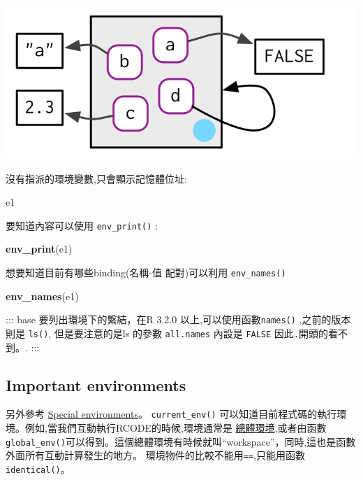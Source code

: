 \documentclass[]{book}
\newenvironment{Shaded}{\begin{snugshade}}{\end{snugshade}}
\newcommand{\KeywordTok}[1]{\textcolor[rgb]{0.13,0.29,0.53}{\textbf{#1}}}
\newcommand{\NormalTok}[1]{#1}
\theoremstyle{definition}
\theoremstyle{definition}
\theoremstyle{definition}
\theoremstyle{remark}
\begin{document}
\begin{center}\includegraphics{diagrams/environments/loop} \end{center}

沒有指派的環境變數,只會顯示記憶體位址:

\begin{Shaded}
\begin{Highlighting}[]
\NormalTok{e1}
\end{Highlighting}
\end{Shaded}

要知道內容可以使用 \texttt{env\_print()} :

\begin{Shaded}
\begin{Highlighting}[]
\KeywordTok{env_print}\NormalTok{(e1)}
\end{Highlighting}
\end{Shaded}

想要知道目前有哪些binding(名稱-值 配對)可以利用 \texttt{env\_names()}

\begin{Shaded}
\begin{Highlighting}[]
\KeywordTok{env_names}\NormalTok{(e1)}
\end{Highlighting}
\end{Shaded}

::: base 要列出環境下的繫結，在R 3.2.0 以上,可以使用函數\texttt{names()}
,之前的版本則是 \texttt{ls()}, 但是要注意的是ls 的參數
\texttt{all.names} 內設是 \texttt{FALSE} 因此\texttt{.}開頭的看不到。.
:::

\subsection{Important environments}\label{important-environments}

另外參考 \protect\hyperlink{function-envs}{Special environments}。
\texttt{current\_env()}
可以知道目前程式碼的執行環境。例如,當我們互動執行RCODE的時候,環境通常是
\protect\hyperlink{globalux5cux2520environment}{總體環境},或者由函數\texttt{global\_env()}可以得到。這個總體環境有時候就叫``workspace''，同時,這也是函數外面所有互動計算發生的地方。
環境物件的比較不能用\texttt{==},只能用函數\texttt{identical()}。
\end{document}
